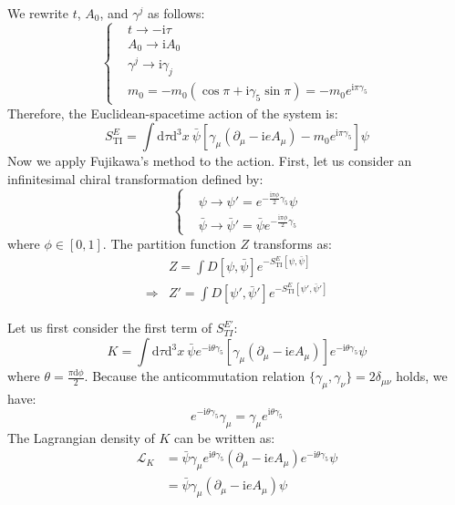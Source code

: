 We rewrite $t$, $A_0$, and $\gamma^j$ as follows:
\begin{equation}
\left\{
\begin{aligned}
&t \to -\mathrm{i}\tau \\
&A_0 \to \mathrm{i} A_0 \\
&\gamma^j \to  \mathrm{i} \gamma_j \\
&m_0 = -m_0 (\cos \pi + \mathrm{i} \gamma_5 \sin \pi) = -m_0 e^{\mathrm{i} \pi \gamma_5}
\end{aligned}
\right.
\end{equation}
Therefore, the Euclidean-spacetime action of the system is:
\begin{equation}
S_{\mathrm{TI}}^E = \int \mathrm{d}\tau \mathrm{d}^3x \ \bar{\psi} [ \gamma_\mu (\partial_\mu - \mathrm{i}eA_\mu) - m_0 e^{\mathrm{i} \pi \gamma_5} ] \psi
\end{equation}
Now we apply Fujikawa's method to the action. First, let us consider an infinitesimal chiral transformation defined by:
\begin{equation}
\left\{
\begin{aligned}
&\psi \to \psi' = e^{-\frac{\mathrm{i} \pi \phi}{2} \gamma_5} \psi \\
&\bar{\psi} \to \bar{\psi}' = \bar{\psi} e^{-\frac{\mathrm{i} \pi \phi}{2} \gamma_5}
\end{aligned}
\right.
\end{equation}
where $\phi \in [0,1]$. The partition function $Z$ transforms as:
\begin{equation}
\begin{aligned}
&Z = \int D[\psi, \bar{\psi}] e^{-S_{\mathrm{TI}}^E[\psi, \bar{\psi}]} \\
\Rightarrow & Z' = \int D[\psi', \bar{\psi}'] e^{-S_{\mathrm{TI}}^E[\psi', \bar{\psi}']}
\end{aligned}
\end{equation}

Let us first consider the first term of $S_{TI}^{E'}$:
\begin{equation}
K = \int \mathrm{d}\tau \mathrm{d}^3x \ \bar{\psi} e^{-\mathrm{i}\theta \gamma_5} [\gamma_\mu(\partial_\mu - \mathrm{i}eA_\mu)] e^{-\mathrm{i}\theta \gamma_5} \psi
\end{equation}
where $\theta = \frac{\pi \mathrm{d}\phi}{2}$. Because the anticommutation relation $\{\gamma_\mu, \gamma_\nu\} = 2\delta_{\mu\nu}$ holds, we have:
\begin{equation}
e^{-\mathrm{i}\theta \gamma_5} \gamma_\mu = \gamma_\mu e^{\mathrm{i}\theta \gamma_5}
\end{equation}
The Lagrangian density of $K$ can be written as:
\begin{equation}
\begin{aligned}
\mathcal{L}_K &= \bar{\psi} \gamma_\mu e^{\mathrm{i}\theta \gamma_5} (\partial_\mu - \mathrm{i}eA_\mu) e^{-\mathrm{i}\theta \gamma_5} \psi \\
&= \bar{\psi} \gamma_\mu (\partial_\mu - \mathrm{i}eA_\mu) \psi
\end{aligned}
\end{equation}

